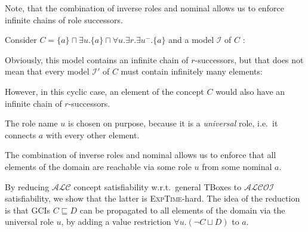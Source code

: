 \begin{example}
	Note, that the combination of inverse roles and nominal
	allows us to enforce infinite chains of role successors.

	Consider $C = \{ a \} \sqcap \exists u.\{ a \} \sqcap \forall u. \exists r.\exists u^-.\{ a \}$
	and a model $\mathcal{I}$ of $C$ :
	\begin{figure}[H]
		\centering
	\end{figure}
	Obviously, this model contains an infinite chain of $r$-successors,
	but that does not mean that every model $\mathcal{I}'$ of $C$ must contain infinitely many elements:
	\begin{figure}[H]
		\centering
	\end{figure}
	However, in this cyclic case, an element of the concept $C$ would also have an infinite chain of $r$-successors.

	The role name $u$ is chosen on purpose,
	because it is a \textit{universal} role, i.e.\ it connects $a$ with every other element.
\end{example}
The combination of inverse roles and nominal allows us to enforce
that all elements of the domain are reachable via some role $u$ from some nominal $a$.

By reducing $\mathcal{ALC}$ concept satisfiability w.r.t.\ general TBoxes to $\mathcal{ALCOI}$ satisfiability,
we show that the latter is \textsc{ExpTime}-hard.
The idea of the reduction is that GCIs $C \sqsubseteq D$ can be propagated to all elements of the domain
via the universal role $u$, by adding a value restriction $\forall u.(\neg C \sqcup D)$ to $a$.

